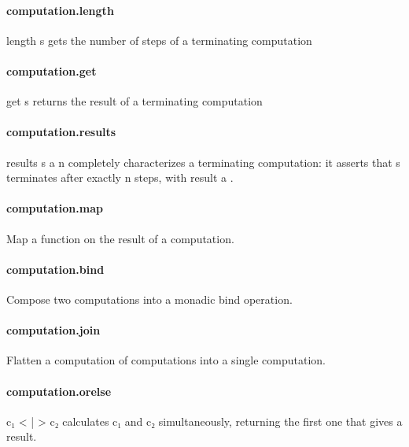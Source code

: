 \documentclass{article}
\begin{document}
\paragraph{computation.length}
\par
\colorbox[RGB]{253,246,227}{{{{\color[RGB]{101, 123, 131} length s }}}} gets the number of steps of a terminating computation
\paragraph{computation.get}
\par
\colorbox[RGB]{253,246,227}{{{{\color[RGB]{101, 123, 131} get s }}}} returns the result of a terminating computation
\paragraph{computation.results}
\par
\colorbox[RGB]{253,246,227}{{{{\color[RGB]{101, 123, 131} results s a n }}}} completely characterizes a terminating computation:
it asserts that 
\colorbox[RGB]{253,246,227}{{{{\color[RGB]{101, 123, 131} s }}}} terminates after exactly 
\colorbox[RGB]{253,246,227}{{{{\color[RGB]{101, 123, 131} n }}}} steps, with result 
\colorbox[RGB]{253,246,227}{{{{\color[RGB]{101, 123, 131} a }}}}.
\paragraph{computation.map}
\par
Map a function on the result of a computation.
\paragraph{computation.bind}
\par
Compose two computations into a monadic 
\colorbox[RGB]{253,246,227}{{{{\color[RGB]{101, 123, 131} bind }}}} operation.
\paragraph{computation.join}
\par
Flatten a computation of computations into a single computation.
\paragraph{computation.orelse}
\par
\colorbox[RGB]{253,246,227}{{{{\color[RGB]{101, 123, 131} c₁  }}}{{{\color[RGB]{181, 137, 0} < }}}{{{\color[RGB]{101, 123, 131} | }}}{{{\color[RGB]{181, 137, 0} > }}}{{{\color[RGB]{101, 123, 131}  c₂ }}}} calculates 
\colorbox[RGB]{253,246,227}{{{{\color[RGB]{101, 123, 131} c₁ }}}} and 
\colorbox[RGB]{253,246,227}{{{{\color[RGB]{101, 123, 131} c₂ }}}} simultaneously, returning
the first one that gives a result.
\end{document}
